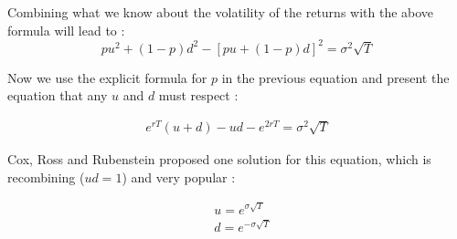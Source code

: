\documentclass[hidelinks]{article}
\newenvironment{nalign}{
    \begin{equation}
    \begin{aligned}
}{
    \end{aligned}
    \end{equation}
    \ignorespacesafterend
}
\begin{document}
	Combining what we know about the volatility of the returns with the above formula will lead to :
	$$pu^2 + (1-p)d^2 - \left[pu+(1-p)d\right]^2 = \sigma^2 \sqrt{T}$$
	
	Now we use the explicit formula for $p$ in the previous equation and present the equation that any $u$ and $d$ must respect :
	
	\begin{nalign}
		e^{rT}(u+d) -ud - e^{2rT} = \sigma^2 \sqrt{T}
	\end{nalign}
	
	Cox, Ross and Rubenstein proposed one solution for this equation, which is recombining ($ud=1$) and very popular :
	
	\begin{nalign}
		&u = e^{\sigma \sqrt{T}} \\
		&d =  e^{-\sigma \sqrt{T}}
	\end{nalign}
\end{document}
